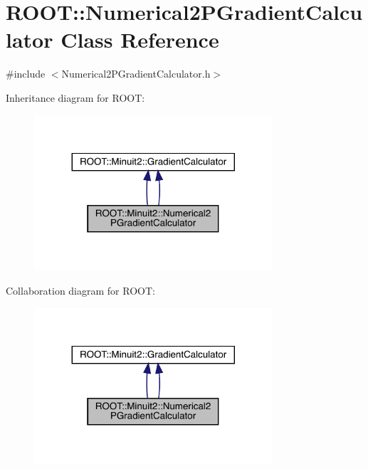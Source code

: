 \hypertarget{classROOT_1_1Minuit2_1_1Numerical2PGradientCalculator}{}\section{R\+O\+OT\+:\+:Numerical2\+P\+Gradient\+Calculator Class Reference}
\label{classROOT_1_1Minuit2_1_1Numerical2PGradientCalculator}


{\ttfamily \#include $<$Numerical2\+P\+Gradient\+Calculator.\+h$>$}



Inheritance diagram for R\+O\+OT\+:\nopagebreak
\begin{figure}[H]
\begin{center}
\leavevmode
\includegraphics[width=251pt]{d7/df9/classROOT_1_1Minuit2_1_1Numerical2PGradientCalculator__inherit__graph}
\end{center}
\end{figure}


Collaboration diagram for R\+O\+OT\+:\nopagebreak
\begin{figure}[H]
\begin{center}
\leavevmode
\includegraphics[width=251pt]{d5/def/classROOT_1_1Minuit2_1_1Numerical2PGradientCalculator__coll__graph}
\end{center}
\end{figure}
